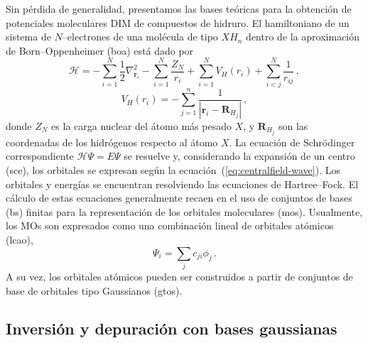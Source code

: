 Sin pérdida de generalidad, presentamos las bases teóricas para la 
obtención de potenciales moleculares DIM de compuestos de hidruro.
El hamiltoniano de un sistema de $N$--electrones de una molécula de 
tipo $X\!H_n$ dentro de la aproximación de Born--Oppenheimer (\acs{boa})
está dado por
\begin{equation}
 \mathcal{H}=-\sum_{i=1}^N \frac{1}{2} \nabla^2_{\mathbf{r}_i} 
 - \sum_{i=1}^N \frac{Z_N}{r_i} 
 + \sum_{i=1}^N V_H(r_i)
 + \sum_{i<j}^N \frac{1}{r_{ij}}\,,
\end{equation}
\begin{equation}
 V_H(r_i)=-\sum_{j=1}^{n} \frac{1}{\left|\mathbf{r}_i-\mathbf{R}_{H_j}\right|}\,,
\end{equation}
donde $Z_N$ es la carga nuclear del átomo más pesado $X$, y 
$\mathbf{R}_{H_j}$ son las coordenadas de los hidrógenos respecto al 
átomo $X$. La ecuación de Schr\"odinger correspondiente 
$\mathcal{H}\Psi=E\Psi$ se resuelve y, considerando la expansión de un 
centro (\acs{sce}), los orbitales se expresan según la 
ecuación~(\ref{eq:centralfield-wave}). Los orbitales y energías se 
encuentran resolviendo las ecuaciones de Hartree--Fock. El cálculo de 
estas ecuaciones generalmente recaen en el uso de conjuntos de bases 
(\acs{bs}) finitas para la representación de los orbitales moleculares 
(\acsp{mo}). Usualmente, los MOs son expresados como una combinación 
lineal de orbitales atómicos (\acs{lcao}), 
\begin{equation}
 \Psi_i=\sum_j c_{ji} \phi_j\,.
\end{equation}
A su vez, los orbitales atómicos pueden ser construidos a partir de 
conjuntos de base de orbitales tipo Gaussianos (\acsp{gto}).

\subsection{Inversión y depuración con bases gaussianas}
\label{subsec:invdepGTO}

